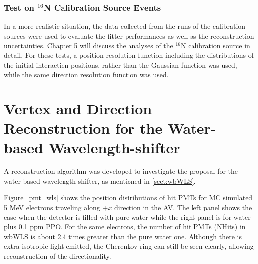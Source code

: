 \subsubsection{Test on $^{16}$N Calibration Source Events}
In a more realistic situation, the data collected from the runs of the calibration sources were used to evaluate the fitter performances as well as the reconstruction uncertainties. Chapter 5 will discuss the analyses of the $^{16}$N calibration source in detail. For these tests, a position resolution function including the distributions of the initial interaction positions, rather than the Gaussian function was used, while the same direction resolution function was used. 

\section{Vertex and Direction Reconstruction for the Water-based Wavelength-shifter}\label{sect:WLSfitter}
A reconstruction algorithm was developed to investigate the proposal for the water-based wavelength-shifter, as mentioned in \ref{sect:wbWLS}.

Figure~\ref{pmt_wls} shows the position distributions of hit PMTs for MC simulated 5 MeV electrons traveling along $+x$ direction in the AV. The left panel shows the case when the detector is filled with pure water while the right panel is for water plus 0.1 ppm PPO. For the same electrons, the number of hit PMTs (NHits) in wbWLS is about 2.4 times greater than the pure water one. Although there is extra isotropic light emitted, the Cherenkov ring can still be seen clearly, allowing reconstruction of the directionality.  

